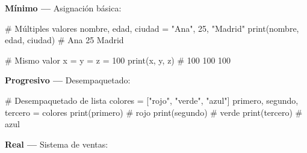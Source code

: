 \documentclass[
  doc,
  floatsintext,
  longtable,
  a4paper,
  nolmodern,
  notxfonts,
  notimes,
  12pt,
  colorlinks=true,linkcolor=blue,citecolor=blue,urlcolor=blue]{apa7}
\newenvironment{Shaded}{\begin{snugshade}}{\end{snugshade}}
\newcommand{\BuiltInTok}[1]{\textcolor[rgb]{0.00,0.23,0.31}{#1}}
\newcommand{\CommentTok}[1]{\textcolor[rgb]{0.37,0.37,0.37}{#1}}
\newcommand{\DecValTok}[1]{\textcolor[rgb]{0.68,0.00,0.00}{#1}}
\newcommand{\FloatTok}[1]{\textcolor[rgb]{0.68,0.00,0.00}{#1}}
\newcommand{\NormalTok}[1]{\textcolor[rgb]{0.00,0.23,0.31}{#1}}
\newcommand{\OperatorTok}[1]{\textcolor[rgb]{0.37,0.37,0.37}{#1}}
\newcommand{\StringTok}[1]{\textcolor[rgb]{0.13,0.47,0.30}{#1}}
\begin{document}
\textbf{Mínimo ---} Asignación básica:

\begin{Shaded}
\begin{Highlighting}[]
\CommentTok{\# Múltiples valores}
\NormalTok{nombre, edad, ciudad }\OperatorTok{=} \StringTok{"Ana"}\NormalTok{, }\DecValTok{25}\NormalTok{, }\StringTok{"Madrid"}
\BuiltInTok{print}\NormalTok{(nombre, edad, ciudad)  }\CommentTok{\# Ana 25 Madrid}

\CommentTok{\# Mismo valor}
\NormalTok{x }\OperatorTok{=}\NormalTok{ y }\OperatorTok{=}\NormalTok{ z }\OperatorTok{=} \DecValTok{100}
\BuiltInTok{print}\NormalTok{(x, y, z)  }\CommentTok{\# 100 100 100}
\end{Highlighting}
\end{Shaded}

\textbf{Progresivo ---} Desempaquetado:

\begin{Shaded}
\begin{Highlighting}[]
\CommentTok{\# Desempaquetado de lista}
\NormalTok{colores }\OperatorTok{=}\NormalTok{ [}\StringTok{"rojo"}\NormalTok{, }\StringTok{"verde"}\NormalTok{, }\StringTok{"azul"}\NormalTok{]}
\NormalTok{primero, segundo, tercero }\OperatorTok{=}\NormalTok{ colores}
\BuiltInTok{print}\NormalTok{(primero)   }\CommentTok{\# rojo}
\BuiltInTok{print}\NormalTok{(segundo)   }\CommentTok{\# verde}
\BuiltInTok{print}\NormalTok{(tercero)   }\CommentTok{\# azul}
\end{Highlighting}
\end{Shaded}

\textbf{Real ---} Sistema de ventas:

\begin{Shaded}
\end{Shaded}
\end{document}
